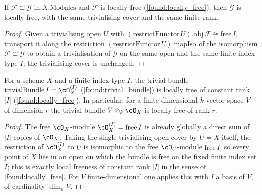\begin{lemma}
  \label{found:locally_free_of_iso}
  If \(\mathcal F\cong\mathcal G\) in \(X.\mathrm{Modules}\) and \(\mathcal F\) is
  locally free (\cref{found:locally_free}), then \(\mathcal G\) is locally free, with the
  same trivialising cover and the same finite rank.
\end{lemma}

\begin{proof}
  \leanok
  Given a trivialising open \(U\) with \((\mathrm{restrictFunctor}\,U).\mathrm{obj}\,
  \mathcal F\cong\mathrm{free}\,I\), transport it along the restriction
  \((\mathrm{restrictFunctor}\,U).\mathrm{mapIso}\) of the isomorphism
  \(\mathcal F\cong\mathcal G\) to obtain a trivialisation of \(\mathcal G\) on the same
  open and the same finite index type \(I\); the trivialising cover is unchanged.
\end{proof}

\begin{lemma}
  \label{found:trivial_bundle_locally_free}
  For a scheme \(X\) and a finite index type \(I\), the trivial bundle
  \(\mathrm{trivialBundle}\,I=\cO_X^{(I)}\) (\cref{found:trivial_bundle}) is locally
  free of constant rank \(|I|\) (\cref{found:locally_free}).  In particular, for a
  finite-dimensional \(k\)-vector space \(V\) of dimension \(r\) the trivial bundle
  \(V\otimes_k\cO_X\) is locally free of rank \(r\).
\end{lemma}

\begin{proof}
  \leanok
  The free \(\cO_X\)-module \(\cO_X^{(I)}=\mathrm{free}\,I\) is already globally a
  direct sum of \(|I|\) copies of \(\cO_X\).  Taking the single trivialising open
  cover by \(U=X\) itself, the restriction of \(\cO_X^{(I)}\) to \(U\) is isomorphic
  to the free \(\cO_U\)-module \(\mathrm{free}\,I\), so every point of \(X\) lies in
  an open on which the bundle is free on the fixed finite index set \(I\); this is
  exactly local freeness of constant rank \(|I|\) in the sense of
  \cref{found:locally_free}.  For \(V\) finite-dimensional one applies this with
  \(I\) a basis of \(V\), of cardinality \(\dim_k V\).
\end{proof}

